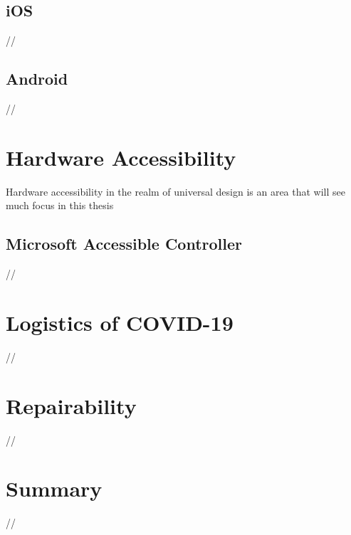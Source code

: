 
\subsection{iOS}
//


\subsection{Android}
//


\section{Hardware Accessibility}
Hardware accessibility in the realm of universal design is an area that will see much focus in this thesis 


\subsection{Microsoft Accessible Controller}
//


\section{Logistics of COVID-19}
//


\section{Repairability}
//


\section{Summary}
//